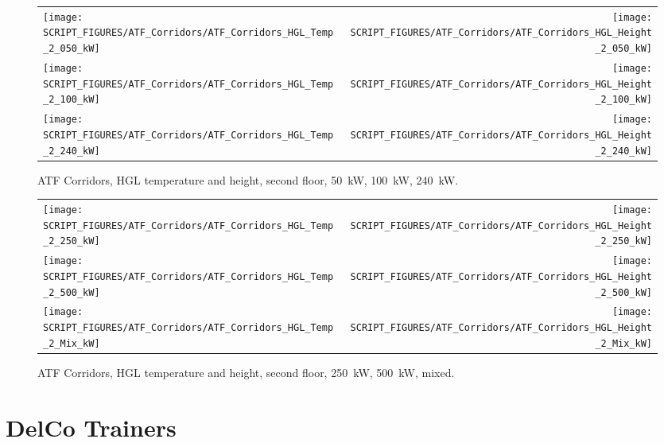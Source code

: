 \begin{figure}[p]
\begin{tabular*}{\textwidth}{l@{\extracolsep{\fill}}r}
\texttt{[image: SCRIPT\_FIGURES/ATF\_Corridors/ATF\_Corridors\_HGL\_Temp\_2\_050\_kW]} &
\texttt{[image: SCRIPT\_FIGURES/ATF\_Corridors/ATF\_Corridors\_HGL\_Height\_2\_050\_kW]} \\
\texttt{[image: SCRIPT\_FIGURES/ATF\_Corridors/ATF\_Corridors\_HGL\_Temp\_2\_100\_kW]} &
\texttt{[image: SCRIPT\_FIGURES/ATF\_Corridors/ATF\_Corridors\_HGL\_Height\_2\_100\_kW]} \\
\texttt{[image: SCRIPT\_FIGURES/ATF\_Corridors/ATF\_Corridors\_HGL\_Temp\_2\_240\_kW]} &
\texttt{[image: SCRIPT\_FIGURES/ATF\_Corridors/ATF\_Corridors\_HGL\_Height\_2\_240\_kW]}
\end{tabular*}
\caption[ATF Corridors, HGL temperature and height, second floor, 50~kW, 100~kW, 240~kW]
{ATF Corridors, HGL temperature and height, second floor, 50~kW, 100~kW, 240~kW.}
\label{ATF_Corridors_HGL_3}
\end{figure}

\begin{figure}[p]
\begin{tabular*}{\textwidth}{l@{\extracolsep{\fill}}r}
\texttt{[image: SCRIPT\_FIGURES/ATF\_Corridors/ATF\_Corridors\_HGL\_Temp\_2\_250\_kW]} &
\texttt{[image: SCRIPT\_FIGURES/ATF\_Corridors/ATF\_Corridors\_HGL\_Height\_2\_250\_kW]} \\
\texttt{[image: SCRIPT\_FIGURES/ATF\_Corridors/ATF\_Corridors\_HGL\_Temp\_2\_500\_kW]} &
\texttt{[image: SCRIPT\_FIGURES/ATF\_Corridors/ATF\_Corridors\_HGL\_Height\_2\_500\_kW]} \\
\texttt{[image: SCRIPT\_FIGURES/ATF\_Corridors/ATF\_Corridors\_HGL\_Temp\_2\_Mix\_kW]} &
\texttt{[image: SCRIPT\_FIGURES/ATF\_Corridors/ATF\_Corridors\_HGL\_Height\_2\_Mix\_kW]}
\end{tabular*}
\caption[ATF Corridors, HGL temperature and height, second floor, 250~kW, 500~kW, mixed]
{ATF Corridors, HGL temperature and height, second floor, 250~kW, 500~kW, mixed.}
\label{ATF_Corridors_HGL_4}
\end{figure}

\clearpage


\section{DelCo Trainers}

